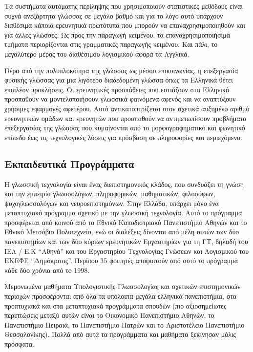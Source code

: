 \documentclass[]{../../metanetpaper}
\begin{document}
\begin{multicols}{2}
Τα συστήματα αυτόματης περίληψης που χρησιμοποιούν στατιστικές μεθόδους είναι συχνά ανεξάρτητα γλώσσας σε μεγάλο βαθμό και για το λόγο αυτό υπάρχουν διαθέσιμα κάποια ερευνητικά πρωτότυπα που μπορούν να επαναχρησιμοποιηθούν και για άλλες γλώσσες. Ως προς την παραγωγή κειμένου, τα επαναχρησιμοποιήσιμα τμήματα περιορίζονται στις γραμματικές παραγωγής κειμένου. Και πάλι, το μεγαλύτερο μέρος του διαθέσιμου λογισμικού αφορά τα Αγγλικά.

Πέρα από την πολυπλοκότητα της γλώσσας ως μέσου επικοινωνίας, η επεξεργασία φυσικής γλώσσας για μια λιγότερο διαδεδομένη γλώσσα όπως τα Ελληνικά θέτει επιπλέον προκλήσεις. Οι ερευνητικές προσπάθειες που εστιάζουν στα Ελληνικά προσπαθούν να μοντελοποιήσουν γλωσσικά φαινόμενα αφενός και να αναπτύξουν χρήσιμες εφαρμογές αφετέρου. Αυτό αντικατοπτρίζεται στον σχετικά αυξημένο αριθμό ερευνητικών ομάδων και ερευνητών που προσπαθούν να αντιμετωπίσουν προβλήματα επεξεργασίας της γλώσσας που κυμαίνονται από το μορφογραφηματικό και φωνητικό επίπεδο έως τις τεχνολογικές λύσεις για πρόσβαση σε πληροφορίες και περιεχόμενο.

\subsection{Εκπαιδευτικά Προγράμματα}

Η γλωσσική τεχνολογία είναι ένας διεπιστημονικός κλάδος, που συνδυάζει τη γνώση και την εμπειρία γλωσσολόγων, πληροφορικών, μαθηματικών, φιλοσόφων, ψυχογλωσσολόγων και νευροεπιστημόνων. Στην Ελλάδα, υπάρχει μόνο ένα μεταπτυχιακό πρόγραμμα σχετικό με την γλωσσική τεχνολογία. Αυτό το πρόγραμμα προσφέρεται από κοινού από το Εθνικό Καποδιστριακό Πανεπιστήμιο Αθηνών και το Εθνικό Μετσόβιο Πολυτεχνείο, ενώ οι διαλέξεις δίνονται από μέλη αυτών των δύο πανεπιστημίων και των δύο κύριων ερευνητικών Εργαστηρίων για τη ΓΤ, δηλαδή του ΙΕΛ / Ε.Κ “Αθηνά” και του Εργαστηρίου Τεχνολογίας Γνώσεων και Λογισμικού του ΕΚΕΦΕ “Δημόκριτος”. Περίπου 35 φοιτητές αποφοιτούν από αυτό το πρόγραμμα κάθε δύο χρόνια από το 1998.

Μεμονωμένα μαθήματα Υπολογιστικής Γλωσσολογίας και σχετικών επιστημονικών περιοχών προσφέρονται από όλα τα υπόλοιπα μεγάλα ελληνικά πανεπιστήμια, στα προπτυχιακά και στα μεταπτυχιακά προγράμματα σπουδών (πιο αξιοσημείωτες περιπτώσεις μεταξύ αυτών είναι το Οικονομικό Πανεπιστήμιο Αθηνών, το Πανεπιστήμιο Πειραιά, το Πανεπιστήμιο Πατρών και το Αριστοτέλειο Πανεπιστήμιο Θεσσαλονίκης). Πολλά από αυτά τα προγράμματα και μαθήματα ξεκίνησαν μόλις πρόσφατα.


\end{multicols}
\end{document}
